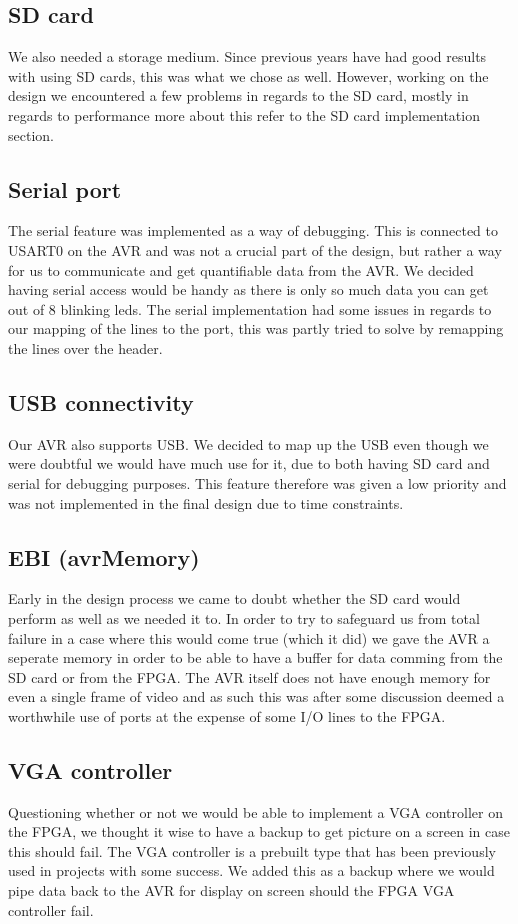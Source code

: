 \subsection{SD card}

We also needed a storage medium. Since previous years have had good results with using SD cards, this was what we chose as well. However, working on the design we encountered a few problems in regards to the SD card, mostly in regards to performance more about this refer to the SD card implementation section.

\subsection{Serial port}

The serial feature was implemented as a way of debugging. This is connected to USART0 on the AVR and was not a crucial part of the design, but rather a way for us to communicate and get quantifiable data from the AVR. We decided having serial access would be handy as there is only so much data you can get out of 8 blinking leds. The serial implementation had some issues in regards to our mapping of the lines to the port, this was partly tried to solve by remapping the lines over the header.

\subsection{USB connectivity}

Our AVR also supports USB. We decided to map up the USB even though we were doubtful we would have much use for it, due to both having SD card and serial for debugging purposes. This feature therefore was given a low priority and was not implemented in the final design due to time constraints.
 
\subsection{EBI (avrMemory)}

Early in the design process we came to doubt whether the SD card would perform as well as we needed it to. In order to try to safeguard us from total failure in a case where this would come true (which it did) we gave the AVR a seperate memory in order to be able to have a buffer for data comming from the SD card or from the FPGA. The AVR itself does not have enough memory for even a single frame of video and as such this was after some discussion deemed a worthwhile use of ports at the expense of some I/O lines to the FPGA.

\subsection{VGA controller}

Questioning whether or not we would be able to implement a VGA controller on the FPGA, we thought it wise to have a backup to get picture on a screen in case this should fail. The VGA controller is a prebuilt type that has been previously used in projects with some success. We added this as a backup where we would pipe data back to the AVR for display on screen should the FPGA VGA controller fail.


